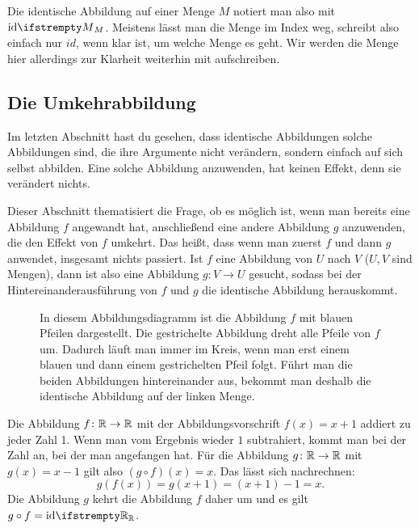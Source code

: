 \documentclass[../../main.tex]{subfiles}
\begin{document}
Die identische Abbildung auf einer Menge $M$ notiert man also mit $\ident[M]$. Meistens lässt man die Menge im Index weg, schreibt also einfach nur $id$, wenn klar ist, um welche Menge es geht. Wir werden die Menge hier allerdings zur Klarheit weiterhin mit aufschreiben.

\subsection{Die Umkehrabbildung}
\label{sec:abbildungen_umkehrabbildung}

Im letzten Abschnitt hast du gesehen, dass identische Abbildungen solche Abbildungen sind, die ihre Argumente nicht verändern, sondern einfach auf sich selbst abbilden. Eine solche Abbildung anzuwenden, hat keinen Effekt, denn sie verändert nichts.

Dieser Abschnitt thematisiert die Frage, ob es möglich ist, wenn man bereits eine Abbildung $f$ angewandt hat, anschließend eine andere Abbildung $g$ anzuwenden, die den Effekt von $f$ umkehrt. Das heißt, dass wenn man zuerst $f$ und dann $g$ anwendet, insgesamt nichts passiert. Ist $f$ eine Abbildung von $U$ nach $V$ ($U,V$ sind Mengen), dann ist also eine Abbildung $g\colon V\rightarrow U$ gesucht, sodass bei der Hintereinanderausführung von $f$ und $g$ die identische Abbildung herauskommt.

\begin{figure}[ht]
    \centering
    
    \caption{In diesem Abbildungsdiagramm ist die Abbildung $f$ mit blauen Pfeilen dargestellt. Die gestrichelte Abbildung dreht alle Pfeile von $f$ um. Dadurch läuft man immer im Kreis, wenn man erst einem blauen und dann einem gestrichelten Pfeil folgt. Führt man die beiden Abbildungen hintereinander aus, bekommt man deshalb die identische Abbildung auf der linken Menge.}
\end{figure}

\begin{example}{}
    Die Abbildung $f\colon\mathbb{R}\rightarrow\mathbb{R}$ mit der Abbildungsvorschrift $f(x)=x+1$ addiert zu jeder Zahl 1. Wenn man vom Ergebnis wieder $1$ subtrahiert, kommt man bei der Zahl an, bei der man angefangen hat. Für die Abbildung $g\colon\mathbb{R}\rightarrow\mathbb{R}$ mit $g(x)=x-1$ gilt also $(g\circ f)(x)=x$. Das lässt sich nachrechnen:
    \[g(f(x))=g(x+1)=(x+1)-1=x.\]
    Die Abbildung $g$ kehrt die Abbildung $f$ daher um und es gilt $g\circ f=\ident[\Real]$.
\end{example}
\end{document}
